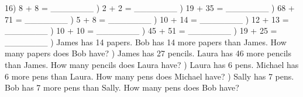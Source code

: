 \documentclass{article}%
\begin{document}
16) 8 + 8 = \_\_\_\_\_\_\_%
\newline%
\newline%
) 2 + 2 = \_\_\_\_\_\_\_%
\newline%
\newline%
) 19 + 35 = \_\_\_\_\_\_\_%
\newline%
\newline%
) 68 + 71 = \_\_\_\_\_\_\_%
\newline%
\newline%
) 5 + 8 = \_\_\_\_\_\_\_%
\newline%
\newline%
) 10 + 14 = \_\_\_\_\_\_\_%
\newline%
\newline%
) 12 + 13 = \_\_\_\_\_\_\_%
\newline%
\newline%
) 10 + 10 = \_\_\_\_\_\_\_%
\newline%
\newline%
) 45 + 51 = \_\_\_\_\_\_\_%
\newline%
\newline%
) 19 + 25 = \_\_\_\_\_\_\_%
\newline%
\newline%
) James has 14 papers. Bob has 14 more papers than James. How many papers does Bob have?%
\newline%
\newline%
) James has 27 pencils. Laura has 46 more pencils than James. How many pencils does Laura have?%
\newline%
\newline%
) Laura has 6 pens. Michael has 6 more pens than Laura. How many pens does Michael have?%
\newline%
\newline%
) Sally has 7 pens. Bob has 7 more pens than Sally. How many pens does Bob have?%
\end{document}
